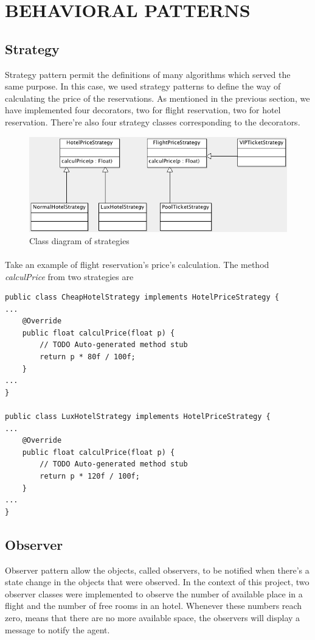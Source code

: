 \section{BEHAVIORAL PATTERNS}
\subsection{Strategy}
Strategy pattern permit the definitions of many algorithms which served the same purpose. In this case, we used strategy patterns to define the way of calculating the price of the reservations. As mentioned in the previous section, we have implemented four decorators, two for flight reservation, two for hotel reservation. There're also four strategy classes corresponding to the decorators.

\begin{figure}[h]
\centering
\includegraphics[width=12cm]{project/images/strategy.png}
\caption{Class diagram of strategies}
\end{figure}

\paragraph{}
Take an example of flight reservation's price's calculation. The method \textit{calculPrice} from two strategies are
\begin{lstlisting}
public class CheapHotelStrategy implements HotelPriceStrategy {
...
	@Override
	public float calculPrice(float p) {
		// TODO Auto-generated method stub
		return p * 80f / 100f;
	}
...
}

public class LuxHotelStrategy implements HotelPriceStrategy {
...
	@Override
	public float calculPrice(float p) {
		// TODO Auto-generated method stub
		return p * 120f / 100f;
	}
...
}
\end{lstlisting}

\subsection{Observer}
Observer pattern allow the objects, called observers, to be notified when there's a state change in the objects that were observed. In the context of this project, two observer classes were implemented to observe the number of available place in a flight and the number of free rooms in an hotel. Whenever these numbers reach zero, means that there are no more available space, the observers will display a message to notify the agent. 

